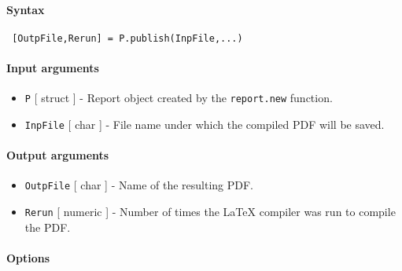 


	\paragraph{Syntax}
 
 \begin{verbatim}
 [OutpFile,Rerun] = P.publish(InpFile,...)
 \end{verbatim}
 
 \paragraph{Input arguments}
 
 \begin{itemize}
 \item
   \texttt{P} {[} struct {]} - Report object created by the
   \texttt{report.new} function.
 \item
   \texttt{InpFile} {[} char {]} - File name under which the compiled PDF
   will be saved.
 \end{itemize}
 
 \paragraph{Output arguments}
 
 \begin{itemize}
 \item
   \texttt{OutpFile} {[} char {]} - Name of the resulting PDF.
 \item
   \texttt{Rerun} {[} numeric {]} - Number of times the LaTeX compiler
   was run to compile the PDF.
 \end{itemize}
 
 \paragraph{Options}
 
